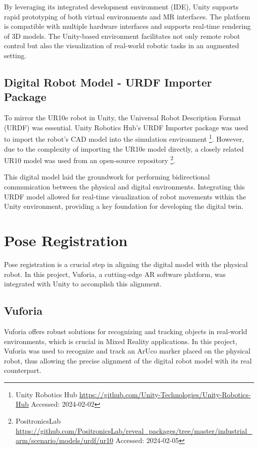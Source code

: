 By leveraging its integrated development environment (\ac{IDE}), Unity supports rapid prototyping of both virtual environments and \ac{MR} interfaces. The platform is compatible with multiple hardware interfaces and supports real-time rendering of 3D models. The Unity-based environment facilitates not only remote robot control but also the visualization of real-world robotic tasks in an augmented setting.

\subsection{Digital Robot Model - URDF Importer Package}
To mirror the UR10e robot in Unity, the Universal Robot Description Format (\ac{URDF}) was essential. Unity Robotics Hub's URDF Importer package was used to import the robot’s CAD model into the simulation environment \footnote{Unity Robotics Hub \url{https://github.com/Unity-Technologies/Unity-Robotics-Hub} Accessed: 2024-02-02}. However, due to the complexity of importing the UR10e model directly, a closely related UR10 model was used from an open-source repository \footnote{PositronicsLab \url{https://github.com/PositronicsLab/reveal_packages/tree/master/industrial_arm/scenario/models/urdf/ur10} Accessed: 2024-02-05}. 

This digital model laid the groundwork for performing bidirectional communication between the physical and digital environments. Integrating this URDF model allowed for real-time visualization of robot movements within the Unity environment, providing a key foundation for developing the digital twin.

\section{Pose Registration}
Pose registration is a crucial step in aligning the digital model with the physical robot. In this project, Vuforia, a cutting-edge \ac{AR} software platform, was integrated with Unity to accomplish this alignment.

\subsection{Vuforia}
\label{section:marker-detection}
Vuforia offers robust solutions for recognizing and tracking objects in real-world environments, which is crucial in Mixed Reality applications. In this project, Vuforia was used to recognize and track an ArUco marker placed on the physical robot, thus allowing the precise alignment of the digital robot model with its real counterpart.

